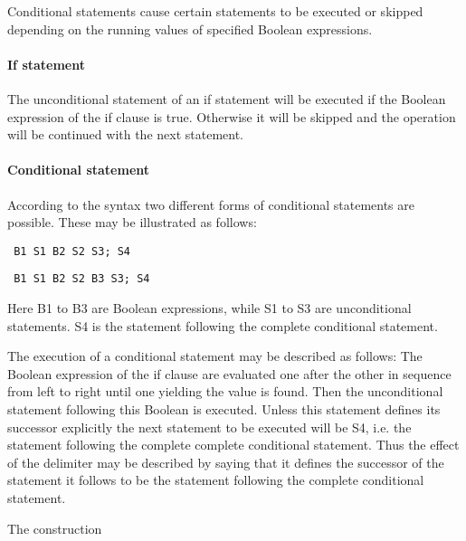 \documentclass[a4paper,11pt]{article}
\begin{document}
Conditional statements cause certain statements to be executed or
skipped depending on the running values of specified Boolean
expressions.

\paragraph{If statement}
\label{LblConditionalStatementsSemanticsIfStatement}
The unconditional statement of an if statement will be executed if the
Boolean expression of the if clause is true.  Otherwise it will be
skipped and the operation will be continued with the next statement.

\paragraph{Conditional statement}
\label{LblConditionalStatementsSemanticsCondStatement}
According to the syntax two different forms of conditional statements
are possible.  These may be illustrated as follows:

\begin{flushleft}
\texttt{ B1  S1   B2  S2  S3; S4}\\
\end{flushleft}

\begin{flushleft}
\texttt{ B1  S1   B2  S2   B3  S3; S4}\\
\end{flushleft}

Here B1 to B3 are Boolean expressions, while S1 to S3 are
unconditional statements.  S4 is the statement following the complete
conditional statement.

The execution of a conditional statement may be described as follows:
The Boolean expression of the if clause are evaluated one after the
other in sequence from left to right until one yielding the value
 is found.  Then the unconditional statement following this
Boolean is executed.  Unless this statement defines its successor
explicitly the next statement to be executed will be S4, i.e.  the
statement following the complete complete conditional statement.  Thus
the effect of the delimiter  may be described by saying
that it defines the successor of the statement it follows to be the
statement following the complete conditional statement.

The construction
\end{document}
